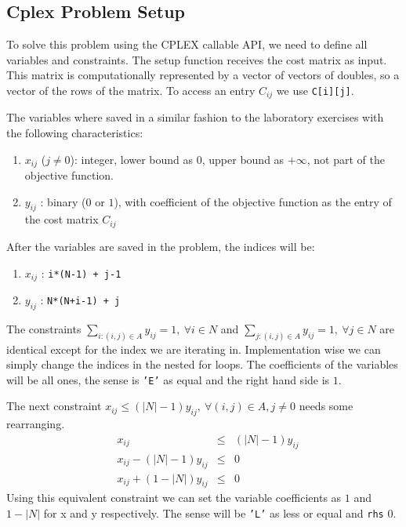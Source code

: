 \documentclass[a4paper,12pt]{article}
\begin{document}
		\subsection{Cplex Problem Setup}
			To solve this problem using the CPLEX callable API, we need to define all variables and constraints.
			The setup function receives the cost matrix as input.
			This matrix is computationally represented by a vector of vectors of doubles, so a vector of the rows of the matrix.
			To access an entry $ C_{ij} $ we use \texttt{C[i][j]}.
			
			The variables where saved in a similar fashion to the laboratory exercises with the following characteristics:
			\begin{enumerate}
				\item $x_{ij}$ ($ j \ne 0 $): integer, lower bound as $ 0 $, upper bound as $ +\infty $, not part of the objective function.
				\item $y_{ij}$ : binary ($ 0$ or $1$), with coefficient of the objective function as the entry of the cost matrix $ C_{ij} $	
			\end{enumerate}
			
			After the variables are saved in the problem, the indices will be:
			\begin{enumerate}
				\item $x_{ij}$ : \texttt{i*(N-1) + j-1}
				\item $y_{ij}$ : \texttt{N*(N+i-1) + j}
			\end{enumerate}
			
			The constraints $ \sum_{i:(i,j)\in A} y_{ij} = 1,\ \forall i \in N  $	and $ \sum_{j:(i,j)\in A} y_{ij} = 1,\ \forall j \in N  $ are identical except for the index we are iterating in.
			Implementation wise we can simply change the indices in the nested for loops.
			The coefficients of the variables will be all ones, the sense is \texttt{'E'} as equal and the right hand side is $ 1 $.
			
			The next constraint $ x_{ij} \le (|N|-1) y_{ij},\ \forall (i,j) \in A, j\ne 0 $ needs some rearranging.
			\begin{align}
				&x_{ij} 				 &\le &(|N|-1) y_{ij} \\
				&x_{ij} - (|N|-1) y_{ij} &\le &0\\	
				&x_{ij} + (1-|N|) y_{ij} &\le &0
			\end{align}
			Using this equivalent constraint we can set the variable coefficients as $ 1 $ and $ 1-|N| $ for x and y respectively.
			The sense will be \texttt{'L'} as less or equal and \texttt{rhs} $ 0 $.
			
\end{document}
